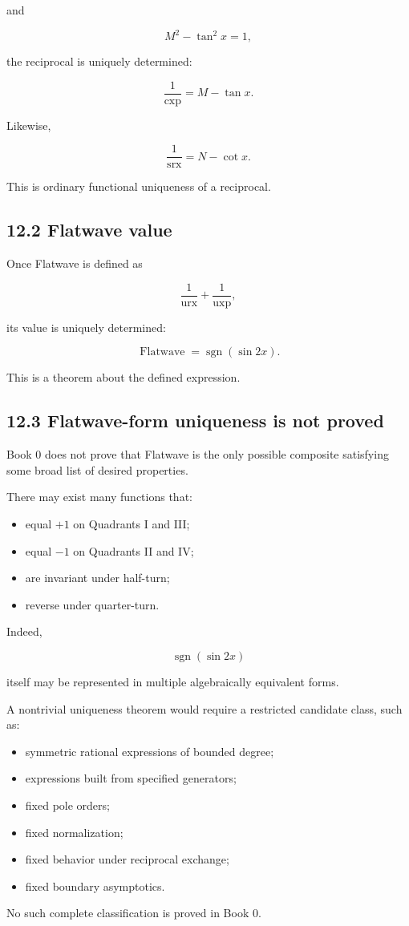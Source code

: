 \documentclass[11pt,oneside,openany]{book}
\newcommand{\PCsubsection}[1]{%
  \subsection*{#1}%
}
\begin{document}
and

\[
M^2-\tan^2x=1,
\]

the reciprocal is uniquely determined:

\[
\frac1{\operatorname{cxp}} = M-\tan x.
\]

Likewise,

\[
\frac1{\operatorname{srx}} = N-\cot x.
\]


This is ordinary functional uniqueness of a reciprocal.

\PCsubsection{12.2 Flatwave value}

Once Flatwave is defined as

\[
\frac1{\operatorname{urx}} + \frac1{\operatorname{uxp}},
\]

its value is uniquely determined:

\[
\operatorname{Flatwave} = \operatorname{sgn}(\sin 2x).
\]

This is a theorem about the defined expression.

\PCsubsection{12.3 Flatwave-form uniqueness is not proved}

Book 0 does not prove that Flatwave is the only possible composite satisfying some broad list of desired properties.

There may exist many functions that:

\begin{itemize}
\item equal \(+1\) on Quadrants I and III;
\item equal \(-1\) on Quadrants II and IV;
\item are invariant under half-turn;
\item reverse under quarter-turn.
\end{itemize}
Indeed,

\[
\operatorname{sgn}(\sin 2x)
\]

itself may be represented in multiple algebraically equivalent forms.

A nontrivial uniqueness theorem would require a restricted candidate class, such as:

\begin{itemize}
\item symmetric rational expressions of bounded degree;
\item expressions built from specified generators;
\item fixed pole orders;
\item fixed normalization;
\item fixed behavior under reciprocal exchange;
\item fixed boundary asymptotics.
\end{itemize}
No such complete classification is proved in Book 0.
\end{document}
